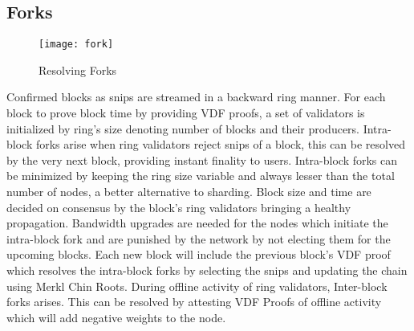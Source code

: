 \documentclass[../Bitcoin Blink.tex]{subfiles}
\begin{document}
\subsection{Forks}
\begin{figure}[H]
\begin{center}
\texttt{[image: fork]}
\caption{Resolving Forks}
\end{center}
\end{figure}
Confirmed blocks as snips are streamed in a backward ring manner. For each block to prove block time by providing VDF proofs, a set of validators is initialized by ring's size denoting number of blocks and their producers. Intra-block forks arise when ring validators reject snips of a block, this can be resolved by the very next block, providing instant finality to users. Intra-block forks can be minimized by keeping the ring size variable and always lesser than the total number of nodes, a better alternative to sharding. Block size and time are decided on consensus by the block's ring validators bringing a healthy propagation. Bandwidth upgrades are needed for the nodes which initiate the intra-block fork and are punished by the network by not electing them for the upcoming blocks. Each new block will include the previous block's VDF proof which resolves the intra-block forks by selecting the snips and updating the chain using Merkl Chin Roots. During offline activity of ring validators, Inter-block forks arises. This can be resolved by attesting VDF Proofs of offline activity which will add negative weights to the node.
\end{document}
